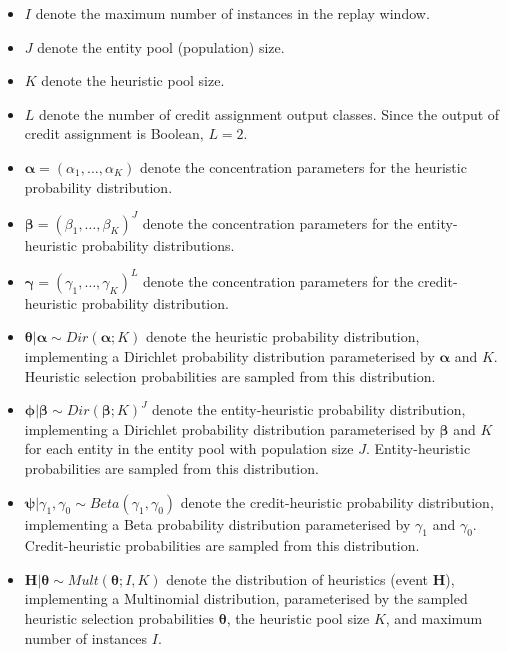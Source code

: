 \begin{itemize}
      \item $I$ denote the maximum number of instances in the replay window.
      \item $J$ denote the entity pool (population) size.
      \item $K$ denote the heuristic pool size.
      \item $L$ denote the number of credit assignment output classes. Since the output of credit assignment is Boolean, $L = 2$.

      \item $\boldsymbol{\alpha} = (\alpha_{1}, \dots, \alpha_{K})$ denote the concentration parameters for the heuristic probability distribution.
      \item $\boldsymbol{\beta} = (\beta_{1}, \dots, \beta_{K})^{J}$ denote the concentration parameters for the entity-heuristic probability distributions.
      \item $\boldsymbol{\gamma} = (\gamma_{1}, \dots, \gamma_{K})^{L}$ denote the concentration parameters for the credit-heuristic probability distribution.

      \item $\boldsymbol{\theta} \vert \boldsymbol{\alpha} \sim Dir(\boldsymbol{\alpha}; K)$ denote the heuristic probability distribution, implementing a Dirichlet probability distribution parameterised by $\boldsymbol{\alpha}$ and $K$. Heuristic selection probabilities are sampled from this distribution.

      \item $\boldsymbol{\phi} \vert \boldsymbol{\beta} \sim Dir(\boldsymbol{\beta}; K)^{J}$ denote the entity-heuristic probability distribution, implementing a Dirichlet probability distribution parameterised by $\boldsymbol{\beta}$ and $K$ for each entity in the entity pool with population size $J$. Entity-heuristic probabilities are sampled from this distribution.

      \item $\boldsymbol{\psi} \vert \gamma_{1}, \gamma_{0}  \sim Beta(\gamma_{1}, \gamma_{0})$ denote the credit-heuristic probability distribution, implementing a Beta probability distribution parameterised by $\gamma_{1}$ and $\gamma_{0}$. Credit-heuristic probabilities are sampled from this distribution.

      \item $\boldsymbol{H} \vert \boldsymbol{\theta} \sim Mult(\boldsymbol{\theta}; I, K)$ denote the distribution of heuristics (event $\boldsymbol{H}$), implementing a Multinomial distribution, parameterised by the sampled heuristic selection probabilities $\boldsymbol{\theta}$, the heuristic pool size $K$, and maximum number of instances $I$.


\end{itemize}
